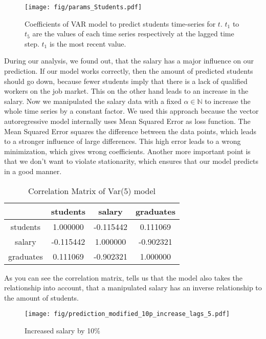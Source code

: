 \documentclass{article}
\theoremstyle{plain}
\theoremstyle{definition}
\theoremstyle{remark}
\begin{document}
\begin{figure}
    \texttt{[image: fig/params\_Students.pdf]}
    \caption{Coefficients of VAR model to predict students time-series
    for $t$. $t_1$ to $t_5$ are the values of each time series respectively at the lagged time step.
    $t_1$ is the most recent value.}
\end{figure}
During our analysis, we found out, that the salary has a major influence on our prediction. If our model works correctly, then the amount
of predicted students should go down, because fewer students imply that there is a lack of qualified workers on the job market.
This on the other hand leads to an increase in the salary. Now we manipulated the salary data with a fixed $\alpha\in \mathbb{N}$ to increase
the whole time series by a constant factor. We used this approach because the vector autoregressive model internally uses Mean Squared Error as loss function.
The Mean Squared Error squares the difference between the data points, which leads to a stronger influence of large differences.
This high error leads to a wrong minimization, which gives wrong coefficients.
Another more important point is that we don't want to violate stationarity, which ensures that our model predicts in a good manner.\\
\begin{table}[H]
    \centering
    \begin{tabular}{c|c|c|c}
        & students & salary & graduates\\
        \hline
        students & 1.000000 & -0.115442 &  0.111069\\
        \hline
        salary & -0.115442 & 1.000000 & -0.902321\\
        \hline
        graduates & 0.111069 & -0.902321 &  1.000000\\
    \end{tabular}
    \caption{Correlation Matrix of Var(5) model}
\end{table}

As you can see the correlation matrix, tells us that the model also takes the relationship into account, that a 
manipulated salary has an inverse relationship to the amount of students.

\begin{figure}[H]
    \centering
    \texttt{[image: fig/prediction\_modified\_10p\_increase\_lags\_5.pdf]}
    \caption{Increased salary by 10\%}
\end{figure}
\end{document}

